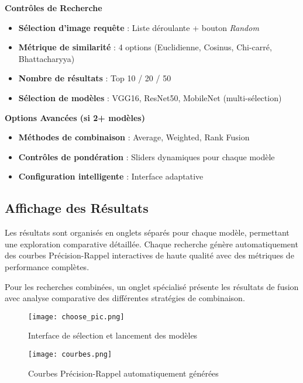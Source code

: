 \documentclass[12pt,a4paper]{article}
\begin{document}
\textbf{Contrôles de Recherche}
\begin{itemize}[leftmargin=2em]
  \item \textbf{Sélection d'image requête} : Liste déroulante + bouton \emph{Random}
  \item \textbf{Métrique de similarité} : 4 options (Euclidienne, Cosinus, Chi-carré, Bhattacharyya)
  \item \textbf{Nombre de résultats} : Top 10 / 20 / 50
  \item \textbf{Sélection de modèles} : VGG16, ResNet50, MobileNet (multi-sélection)
\end{itemize}

\textbf{Options Avancées (si 2+ modèles)}
\begin{itemize}[leftmargin=2em]
  \item \textbf{Méthodes de combinaison} : Average, Weighted, Rank Fusion
  \item \textbf{Contrôles de pondération} : Sliders dynamiques pour chaque modèle
  \item \textbf{Configuration intelligente} : Interface adaptative
\end{itemize}

\subsection{Affichage des Résultats}

\begin{implementedbox}
Les résultats sont organisés en onglets séparés pour chaque modèle, permettant une exploration comparative détaillée. Chaque recherche génère automatiquement des courbes Précision-Rappel interactives de haute qualité avec des métriques de performance complètes.

Pour les recherches combinées, un onglet spécialisé présente les résultats de fusion avec analyse comparative des différentes stratégies de combinaison.
\end{implementedbox}

\begin{figure}[H]
  \centering
  \texttt{[image: choose\_pic.png]}
  \caption{Interface de sélection et lancement des modèles}
  \label{fig:model_selection}
\end{figure}

\begin{figure}[H]
  \centering
  \texttt{[image: courbes.png]}
  \caption{Courbes Précision-Rappel automatiquement générées}
  \label{fig:precision_recall}
\end{figure}
\end{document}
